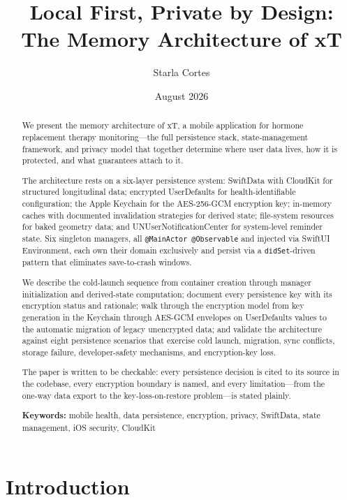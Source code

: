 \documentclass[11pt,a4paper]{article}
\title{\textbf{Local First, Private by Design:}\\[0.3em]
\large The Memory Architecture of xT}
\author{Starla Cortes}
\date{August 2026}
\newcommand{\code}[1]{\texttt{\small #1}}
\begin{document}
\maketitle

\begin{abstract}
\noindent
We present the memory architecture of xT, a mobile application for hormone
replacement therapy monitoring---the full persistence stack, state-management
framework, and privacy model that together determine where user data lives,
how it is protected, and what guarantees attach to it.

The architecture rests on a six-layer persistence system: SwiftData with
CloudKit for structured longitudinal data; encrypted UserDefaults for
health-identifiable configuration; the Apple Keychain for the AES-256-GCM
encryption key; in-memory caches with documented invalidation strategies for
derived state; file-system resources for baked geometry data; and
UNUserNotificationCenter for system-level reminder state. Six singleton
managers, all \code{@MainActor @Observable} and injected via SwiftUI
Environment, each own their domain exclusively and persist via a
\code{didSet}-driven pattern that eliminates save-to-crash windows.

We describe the cold-launch sequence from container creation through
manager initialization and derived-state computation; document every
persistence key with its encryption status and rationale; walk through the
encryption model from key generation in the Keychain through AES-GCM
envelopes on UserDefaults values to the automatic migration of legacy
unencrypted data; and validate the architecture against eight persistence
scenarios that exercise cold launch, migration, sync conflicts, storage
failure, developer-safety mechanisms, and encryption-key loss.

The paper is written to be checkable: every persistence decision is cited to
its source in the codebase, every encryption boundary is named, and every
limitation---from the one-way data export to the key-loss-on-restore
problem---is stated plainly.

\textbf{Keywords:} mobile health, data persistence, encryption, privacy,
SwiftData, state management, iOS security, CloudKit
\end{abstract}

\tableofcontents
\clearpage

\section{Introduction}
\label{sec:intro}
\end{document}
